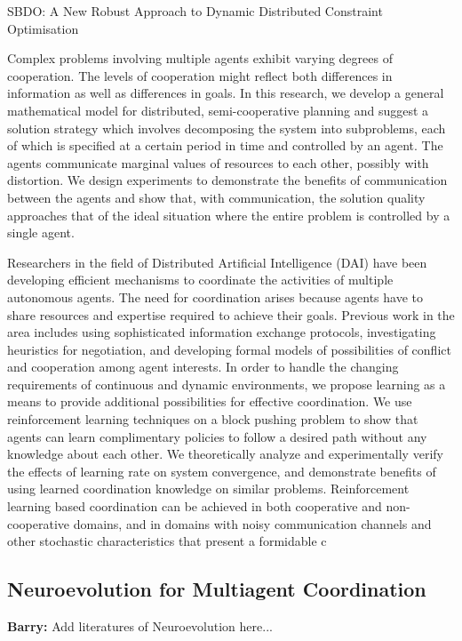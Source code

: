 \documentclass[conference]{IEEEtran}
\begin{document}
SBDO: A New Robust Approach to Dynamic Distributed Constraint Optimisation

\cite{zhang2013coordinating}

\cite{banerjee2012sample}

\cite{kraemer2012informed}

\cite{boukhtouta2011adaptive}
Complex problems involving multiple agents exhibit varying degrees of
cooperation. The levels of cooperation might reflect both differences in
information as well as differences in goals. In this research, we develop a
general mathematical model for distributed, semi-cooperative planning and
suggest a solution strategy which involves decomposing the system into
subproblems, each of which is specified at a certain period in time and
controlled by an agent. The agents communicate marginal values of resources to
each other, possibly with distortion. We design experiments to demonstrate the
benefits of communication between the agents and show that, with
communication, the solution quality approaches that of the ideal situation
where the entire problem is controlled by a single agent.

\cite{sen1994learning}
Researchers in the field of Distributed Artificial
Intelligence (DAI) have been developing efficient
mechanisms to coordinate the activities of multiple
autonomous agents. The need for coordination
arises because agents have to share resources
and expertise required to achieve their goals.
Previous work in the area includes using sophisticated
information exchange protocols, investigating
heuristics for negotiation, and developing
formal models of possibilities of conflict and cooperation
among agent interests. In order to handle
the changing requirements of continuous and
dynamic environments, we propose learning as a
means to provide additional possibilities for effective
coordination. We use reinforcement learning
techniques on a block pushing problem to show
that agents can learn complimentary policies to
follow a desired path without any knowledge
about each other. We theoretically analyze and
experimentally verify the effects of learning rate
on system convergence, and demonstrate benefits
of using learned coordination knowledge on similar
problems. Reinforcement learning based coordination
can be achieved in both cooperative and
non-cooperative domains, and in domains with
noisy communication channels and other stochastic
characteristics that present a formidable c

\subsection{Neuroevolution for Multiagent Coordination}
\textbf{Barry:}
Add literatures of Neuroevolution here...
\end{document}
